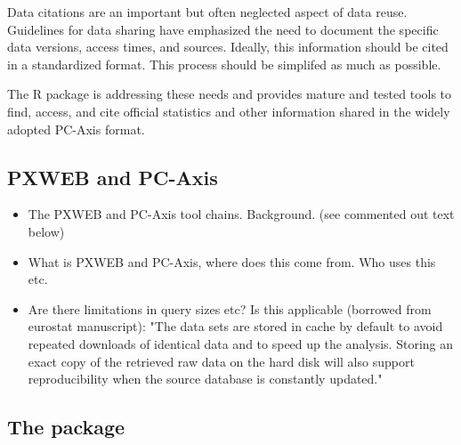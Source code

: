 Data citations are an important but often neglected aspect of data
reuse. Guidelines for data sharing have emphasized the need to
document the specific data versions, access times, and
sources. Ideally, this information should be cited in a standardized
format. This process should be simplifed as much as possible.


The  R package is addressing these needs and provides
mature and tested tools to find, access, and cite official statistics
and other information shared in the widely adopted PC-Axis format.


\subsection[PXWEB and PC-Axis]{PXWEB and PC-Axis}

\begin{itemize}
    \item The PXWEB and PC-Axis tool chains. Background. (see commented out text below)
    \item What is PXWEB and PC-Axis, where does this come from. Who uses this etc.
    \item Are there limitations in query sizes etc? Is this applicable (borrowed from eurostat manuscript): "The data sets are stored in cache by default to avoid repeated downloads of identical data and to speed up the analysis. Storing an exact copy of the retrieved raw data on the hard disk will also support reproducibility when the source database is constantly updated."
\end{itemize}


\subsection{The  package}



